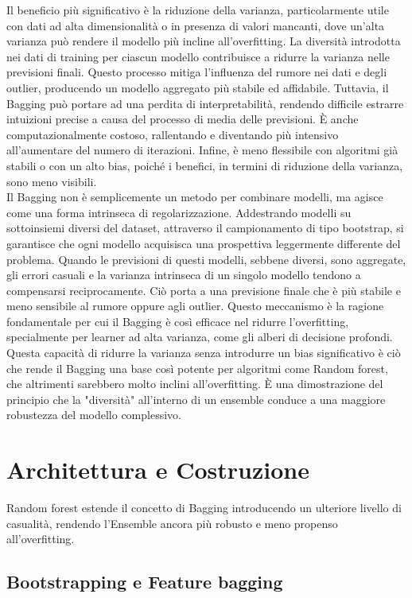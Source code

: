 \documentclass[a4paper,12pt]{report}
\begin{document}
	Il beneficio più significativo è la riduzione della varianza, particolarmente utile con dati ad alta dimensionalità o in presenza di valori mancanti, dove un'alta varianza può rendere il modello più incline all'overfitting. La diversità introdotta nei dati di training per ciascun modello contribuisce a ridurre la varianza nelle previsioni finali. Questo processo mitiga l'influenza del rumore nei dati e degli outlier, producendo un modello aggregato più stabile ed affidabile. Tuttavia, il Bagging può portare ad una perdita di interpretabilità, rendendo difficile estrarre intuizioni precise a causa del processo di media delle previsioni. È anche computazionalmente costoso, rallentando e diventando più intensivo all'aumentare del numero di iterazioni. Infine, è meno flessibile con algoritmi già stabili o con un alto bias, poiché i benefici, in termini di riduzione della varianza, sono meno visibili. \\
	Il Bagging non è semplicemente un metodo per combinare modelli, ma agisce come una forma intrinseca di regolarizzazione. Addestrando modelli su sottoinsiemi diversi del dataset, attraverso il campionamento di tipo bootstrap, si garantisce che ogni modello acquisisca una prospettiva leggermente differente del problema. Quando le previsioni di questi modelli, sebbene diversi, sono aggregate, gli errori casuali e la varianza intrinseca di un singolo modello tendono a compensarsi reciprocamente. Ciò porta a una previsione finale che è più stabile e meno sensibile al rumore oppure agli outlier. Questo meccanismo è la ragione fondamentale per cui il Bagging è così efficace nel ridurre l'overfitting, specialmente per learner ad alta varianza, come gli alberi di decisione profondi. Questa capacità di ridurre la varianza senza introdurre un bias significativo è ciò che rende il Bagging una base così potente per algoritmi come Random forest, che altrimenti sarebbero molto inclini all'overfitting. È una dimostrazione del principio che la "diversità" all'interno di un ensemble conduce a una maggiore robustezza del modello complessivo.
	
	\section{Architettura e Costruzione}
	
	Random forest estende il concetto di Bagging introducendo un ulteriore livello di casualità, rendendo l'Ensemble ancora più robusto e meno propenso all'overfitting.
	
	\subsection{Bootstrapping e Feature bagging}
	
\end{document}
